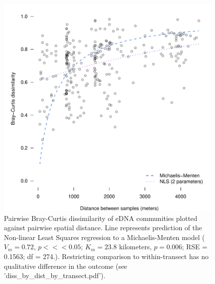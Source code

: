\documentclass[11pt,letterpaper]{article} %
\begin{document}
\begin{figure}[h!] %
  \centering
    \includegraphics[width=1\textwidth]{../../Figures/diss_by_dist.pdf}
    \caption{Pairwise Bray-Curtis dissimilarity of eDNA communities plotted against pairwise spatial distance.
    Line represents prediction of the Non-linear Least Squares regression to a Michaelis-Menten model ($V_m = 0.72$, $p <<< 0.05$; $K_m = 23.8$ kilometers, $p = 0.006$; RSE = 0.1563; df = 274.).
    Restricting comparison to within-transect has no qualitative difference in the outcome (see 'diss\_by\_dist\_by\_transect.pdf').
    }
  \label{comm_diss_by_geo_dist} %
\end{figure}
\end{document}

